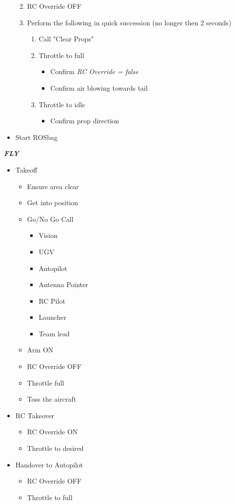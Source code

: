 \documentclass[]{auvsi_doc}
\begin{document}
\begin{itemize}
\begin{enumerate}
\begin{itemize}
		\end{itemize}
		\item RC Override OFF
		\item Perform the following in quick succession (no longer then 2 seconds)
		\begin{enumerate}
			\item Call "Clear Props"
			\item Throttle to full
			\begin{itemize}
				\item Confirm \textit{RC Override = false}
				\item Confirm air blowing towards tail
			\end{itemize}
			\item Throttle to idle
			\begin{itemize}
				\item Confirm prop direction
			\end{itemize}
		\end{enumerate}
	\end{enumerate}
        \item Start ROSbag
\end{itemize}

\hrulefill

\textit{\textbf{FLY}}
\begin{itemize}
	\item Takeoff
	\begin{itemize}
		\item Ensure area clear
		\item Get into position
		\item Go/No Go Call
		\begin{itemize}
			\item Vision
			\item UGV
			\item Autopilot
			\item Antenna Pointer
			\item RC Pilot
			\item Launcher
			\item Team lead
		\end{itemize}
		\item Arm ON
		\item RC Override OFF
		\item Throttle full
		\item Toss the aircraft
	\end{itemize}
	\item RC Takeover
	\begin{itemize}
		\item RC Override ON
		\item Throttle to desired
	\end{itemize}
	\item Handover to Autopilot
	\begin{itemize}
		\item RC Override OFF
		\item Throttle to full
	\end{itemize}
\end{itemize}
\end{document}
